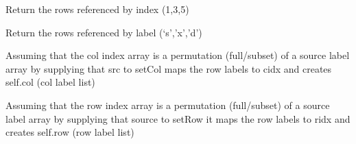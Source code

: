 \documentclass[a4paper,11pt,english]{sphinxmanual}
\begin{document}
\begin{fulllineitems}

\begin{fulllineitems}
\label{modules_doc:cbmpy.CBDataStruct.StructMatrix.getRowsByIdx}
Return the rows referenced by index (1,3,5)

\end{fulllineitems}


\begin{fulllineitems}
\label{modules_doc:cbmpy.CBDataStruct.StructMatrix.getRowsByName}
Return the rows referenced by label (`s','x','d')

\end{fulllineitems}


\begin{fulllineitems}
\label{modules_doc:cbmpy.CBDataStruct.StructMatrix.setCol}
Assuming that the col index array is a permutation (full/subset)
of a source label array by supplying that src to setCol
maps the row labels to cidx and creates self.col (col label list)

\end{fulllineitems}


\begin{fulllineitems}
\label{modules_doc:cbmpy.CBDataStruct.StructMatrix.setRow}
Assuming that the row index array is a permutation (full/subset)
of a source label array by supplying that source to setRow it
maps the row labels to ridx and creates self.row (row label list)

\end{fulllineitems}


\end{fulllineitems}

\end{document}
